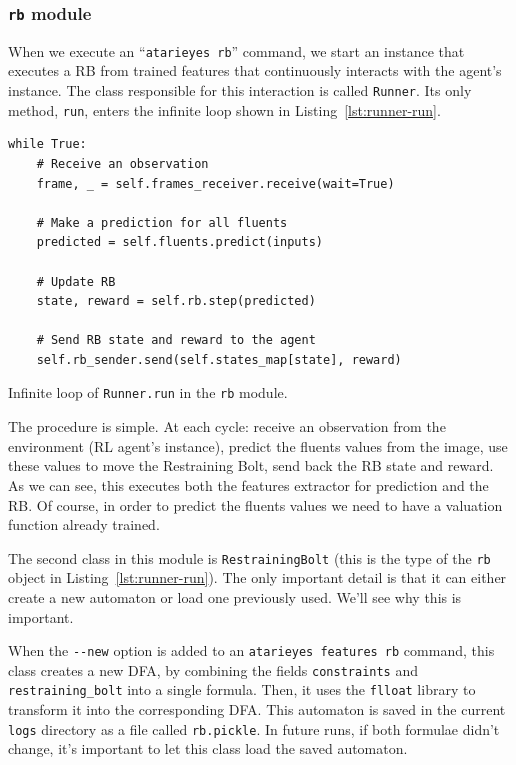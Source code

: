 \subsubsection*{\texttt{rb} module}

When we execute an ``\texttt{atarieyes rb}'' command, we start an instance
that executes a RB from trained features that continuously interacts with the
agent's instance. The class responsible for this interaction is called
\texttt{Runner}. Its only method, \texttt{run}, enters the infinite loop shown
in Listing~\ref{lst:runner-run}.
\begin{listing}
	\begin{verbatim}
while True:
	# Receive an observation
	frame, _ = self.frames_receiver.receive(wait=True)

	# Make a prediction for all fluents
	predicted = self.fluents.predict(inputs)

	# Update RB
	state, reward = self.rb.step(predicted)

	# Send RB state and reward to the agent
	self.rb_sender.send(self.states_map[state], reward)
\end{verbatim}
\caption{Infinite loop of \texttt{Runner.run} in the \texttt{rb} module.}
\label{lst:runner-run}
\end{listing}
The procedure is simple. At each cycle: receive an observation from the
environment (RL agent's instance), predict the fluents values from the image,
use these values to move the Restraining Bolt, send back the RB state and
reward. As we can see, this executes both the features extractor for
prediction and the RB. Of course, in order to predict the fluents values we
need to have a valuation function already trained.

The second class in this module is \texttt{RestrainingBolt} (this is the type
of the \texttt{rb} object in Listing~\ref{lst:runner-run}). The only important
detail is that it can either create a new automaton or load one previously
used. We'll see why this is important.

When the \verb|--new| option is added to an \verb|atarieyes features rb|
command, this class creates a new DFA, by combining the fields
\texttt{constraints} and \texttt{restraining\_bolt} into a single formula.
Then, it uses the \texttt{flloat} library to transform it into the
corresponding DFA. This automaton is saved in the current \texttt{logs}
directory as a file called \verb|rb.pickle|. In future runs, if both formulae
didn't change, it's important to let this class load the saved automaton.

